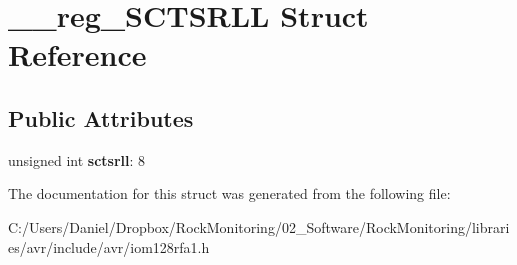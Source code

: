 \hypertarget{struct____reg___s_c_t_s_r_l_l}{}\section{\+\_\+\+\_\+reg\+\_\+\+S\+C\+T\+S\+R\+LL Struct Reference}
\label{struct____reg___s_c_t_s_r_l_l}
\subsection*{Public Attributes}
\begin{DoxyCompactItemize}
\item 
unsigned int {\bfseries sctsrll}\+: 8\hypertarget{struct____reg___s_c_t_s_r_l_l_ac37fbf90269a53e7aed467d403ac86e0}{}\label{struct____reg___s_c_t_s_r_l_l_ac37fbf90269a53e7aed467d403ac86e0}

\end{DoxyCompactItemize}


The documentation for this struct was generated from the following file\+:\begin{DoxyCompactItemize}
\item 
C\+:/\+Users/\+Daniel/\+Dropbox/\+Rock\+Monitoring/02\+\_\+\+Software/\+Rock\+Monitoring/libraries/avr/include/avr/iom128rfa1.\+h\end{DoxyCompactItemize}
